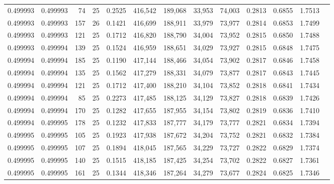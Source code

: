 \begin{tabular}{rrrrrrrrrrrrr}
0.499993 & 0.499993 &    74 &  25 &                                     0.2525 & 416,542 & 189,068 &  33,953 &  74,003 & 0.2813 & 0.6855 & 1.7513 \\
0.499993 & 0.499993 &   157 &  26 &                                     0.1421 & 416,699 & 188,911 &  33,979 &  73,977 & 0.2814 & 0.6853 & 1.7499 \\
0.499993 & 0.499993 &   121 &  25 &                                     0.1712 & 416,820 & 188,790 &  34,004 &  73,952 & 0.2815 & 0.6850 & 1.7488 \\
0.499993 & 0.499994 &   139 &  25 &                                     0.1524 & 416,959 & 188,651 &  34,029 &  73,927 & 0.2815 & 0.6848 & 1.7475 \\
0.499994 & 0.499994 &   185 &  25 &                                     0.1190 & 417,144 & 188,466 &  34,054 &  73,902 & 0.2817 & 0.6846 & 1.7458 \\
0.499994 & 0.499994 &   135 &  25 &                                     0.1562 & 417,279 & 188,331 &  34,079 &  73,877 & 0.2817 & 0.6843 & 1.7445 \\
0.499994 & 0.499994 &   121 &  25 &                                     0.1712 & 417,400 & 188,210 &  34,104 &  73,852 & 0.2818 & 0.6841 & 1.7434 \\
0.499994 & 0.499994 &    85 &  25 &                                     0.2273 & 417,485 & 188,125 &  34,129 &  73,827 & 0.2818 & 0.6839 & 1.7426 \\
0.499994 & 0.499994 &   170 &  25 &                                     0.1282 & 417,655 & 187,955 &  34,154 &  73,802 & 0.2819 & 0.6836 & 1.7410 \\
0.499994 & 0.499995 &   178 &  25 &                                     0.1232 & 417,833 & 187,777 &  34,179 &  73,777 & 0.2821 & 0.6834 & 1.7394 \\
0.499995 & 0.499995 &   105 &  25 &                                     0.1923 & 417,938 & 187,672 &  34,204 &  73,752 & 0.2821 & 0.6832 & 1.7384 \\
0.499995 & 0.499995 &   107 &  25 &                                     0.1894 & 418,045 & 187,565 &  34,229 &  73,727 & 0.2822 & 0.6829 & 1.7374 \\
0.499995 & 0.499995 &   140 &  25 &                                     0.1515 & 418,185 & 187,425 &  34,254 &  73,702 & 0.2822 & 0.6827 & 1.7361 \\
0.499995 & 0.499995 &   161 &  25 &                                     0.1344 & 418,346 & 187,264 &  34,279 &  73,677 & 0.2824 & 0.6825 & 1.7346 \\

\end{tabular}
